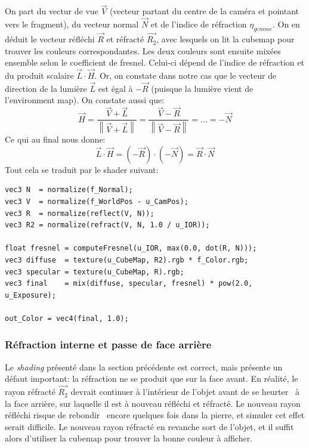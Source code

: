\documentclass[a4paper,12pt]{article}
\newcommand{\svg}[2][0cm]{
    \begin{figure}[H]
        \centering
        \def\svgwidth{\columnwidth - #1}
        
    \end{figure}
}
\newcommand{\norm}[1]{\left\lVert#1\right\rVert}
\begin{document}
On part du vectur de vue $\overrightarrow{V}$ (vecteur partant du centre de la caméra et pointant vers le fragment), du vecteur
normal $\overrightarrow{N}$ et de l'indice de réfraction $\eta_{gemme}$. On en déduit le vecteur réfléchi $\overrightarrow{R}$
et réfracté $\overrightarrow{R_2}$, avec lesquels on lit la cubemap pour trouver les couleurs correspondantes. Les deux couleurs
sont ensuite mixées ensemble selon le coefficient de fresnel. Celui-ci dépend de l'indice de réfraction et du produit scalaire
$\overrightarrow{L}\cdot\overrightarrow{H}$. Or, on constate dans notre cas que le vecteur de direction de la lumière $\overrightarrow{L}$
est égal à $-\overrightarrow{R}$ (puisque la lumière vient de l'environment map). On constate aussi que:
\[
    \overrightarrow{H} = \frac{\overrightarrow{V} + \overrightarrow{L}}{\norm{\overrightarrow{V} + \overrightarrow{L}}}
    = \frac{\overrightarrow{V} - \overrightarrow{R}}{\norm{\overrightarrow{V} - \overrightarrow{R}}}
    = \ldots = -\overrightarrow{N}
\]
Ce qui au final nous donne:
\[
    \overrightarrow{L}\cdot\overrightarrow{H} = (-\overrightarrow{R})\cdot(-\overrightarrow{N}) = \overrightarrow{R}\cdot\overrightarrow{N}
\]
Tout cela se traduit par le shader suivant:
\begin{lstlisting}
vec3 N  = normalize(f_Normal);
vec3 V  = normalize(f_WorldPos - u_CamPos);
vec3 R  = normalize(reflect(V, N));
vec3 R2 = normalize(refract(V, N, 1.0 / u_IOR));

float fresnel = computeFresnel(u_IOR, max(0.0, dot(R, N)));
vec3 diffuse  = texture(u_CubeMap, R2).rgb * f_Color.rgb;
vec3 specular = texture(u_CubeMap, R).rgb;
vec3 final    = mix(diffuse, specular, fresnel) * pow(2.0, u_Exposure);

out_Color = vec4(final, 1.0);
\end{lstlisting}

\subsubsection{Réfraction interne et passe de face arrière}
Le \emph{shading} présenté dans la section précédente est correct, mais présente un défaut important: la réfraction ne se
produit que sur la face avant. En réalité, le rayon réfracté $\overrightarrow{R_2}$ devrait continuer à l'intérieur de l'objet
avant de se \og heurter \fg\ à la face arrière, sur laquelle il est à nouveau réfléchi et réfracté. Le nouveau rayon réfléchi
risque de \og rebondir \fg\ encore quelques fois dans la pierre, et simuler cet effet serait difficile. Le nouveau rayon réfracté
en revanche sort de l'objet, et il suffit alors d'utiliser la cubemap pour trouver la bonne couleur à afficher.
\svg[6cm]{refr_int}
\end{document}
